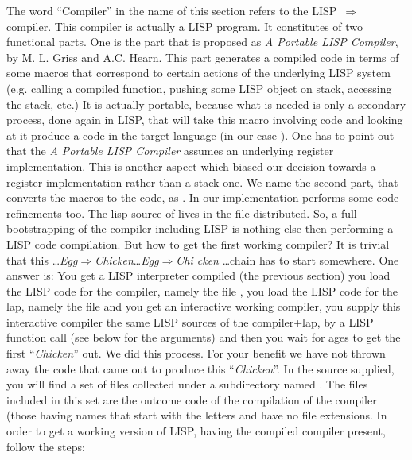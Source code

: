 The word ``Compiler'' in the name of this section refers to the
\mbox{LISP $\Rightarrow$ \C} compiler. This compiler is actually a LISP
program. It constitutes of two functional parts. One is the part that is
proposed as {\em A Portable LISP Compiler}, by M. L. Griss and A.C. Hearn.
This part generates a compiled code in terms of some macros that correspond
to certain actions of the underlying LISP system (e.g. calling a compiled
function, pushing some LISP object on stack, accessing the stack, etc.)
It  is  actually  portable,  because  what  is  needed  is only a secondary
process, done again in LISP, that will take this macro involving code and
looking at it produce a code in the target language (in our case \CC).
One has to point out that the {\em A Portable LISP Compiler} assumes an
underlying register implementation. This is another aspect which biased
our decision towards a register implementation rather than a stack one.
We name the second part, that converts the macros to the \C code, as
.
In our implementation  performs some code refinements too.
The lisp source of  lives in the file  distributed.
So, a full bootstrapping of the compiler including LISP is nothing else then
performing a LISP code compilation. But how to get the first working
compiler? It is trivial that this
\ldots{\em{Egg}}$\Rightarrow${\em{Chicken}}\ldots{\em{Egg}}$\Rightarrow${\em{Chi
cken}}
\ldots chain has to start somewhere. One answer is: You get a
LISP  interpreter compiled (the previous section)
you load the LISP code for the compiler, namely the file ,
you load the LISP code for the lap, namely the file  and
 you get an interactive working
compiler, you supply this interactive  compiler  the  same
LISP  sources  of  the
compiler+lap, by a  LISP function call (see below for the
arguments) and then
 you wait for ages to get the first ``{\em{Chicken}}'' out.
We did this process. For your benefit we have not thrown away the \C code
that came out to produce this ``{\em{Chicken}}''.  In the source supplied,
you will find a set of files collected under
 a subdirectory named
 . The files included in this set
are  the  outcome code of the compilation of the compiler (those having
names that start with the letters  and have no file extensions.
In order to get a working version of  LISP,  having  the  compiled  compiler
present, follow the steps:

